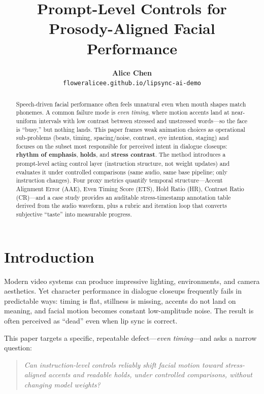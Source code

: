 \documentclass[11pt,a4paper]{article}
\title{\textbf{Prompt-Level Controls for Prosody-Aligned Facial Performance}}
\author{
    \textbf{Alice Chen} \\
    \texttt{floweralicee.github.io/lipsync-ai-demo}
}
\date{}
\begin{document}
\maketitle

\begin{abstract}
Speech-driven facial performance often feels unnatural even when mouth shapes match phonemes. A common failure mode is \textit{even timing}, where motion accents land at near-uniform intervals with low contrast between stressed and unstressed words---so the face is ``busy,'' but nothing lands. This paper frames weak animation choices as operational sub-problems (beats, timing, spacing/noise, contrast, eye intention, staging) and focuses on the subset most responsible for perceived intent in dialogue closeups: \textbf{rhythm of emphasis}, \textbf{holds}, and \textbf{stress contrast}. The method introduces a prompt-level acting control layer (instruction structure, not weight updates) and evaluates it under controlled comparisons (same audio, same base pipeline; only instruction changes). Four proxy metrics quantify temporal structure---Accent Alignment Error (AAE), Even Timing Score (ETS), Hold Ratio (HR), Contrast Ratio (CR)---and a case study provides an auditable stress-timestamp annotation table derived from the audio waveform, plus a rubric and iteration loop that converts subjective ``taste'' into measurable progress.
\end{abstract}

\section{Introduction}

Modern video systems can produce impressive lighting, environments, and camera aesthetics. Yet character performance in dialogue closeups frequently fails in predictable ways: timing is flat, stillness is missing, accents do not land on meaning, and facial motion becomes constant low-amplitude noise. The result is often perceived as ``dead'' even when lip sync is correct.

This paper targets a specific, repeatable defect---\textit{even timing}---and asks a narrow question:

\begin{quote}
\textit{Can instruction-level controls reliably shift facial motion toward stress-aligned accents and readable holds, under controlled comparisons, without changing model weights?}
\end{quote}
\end{document}
